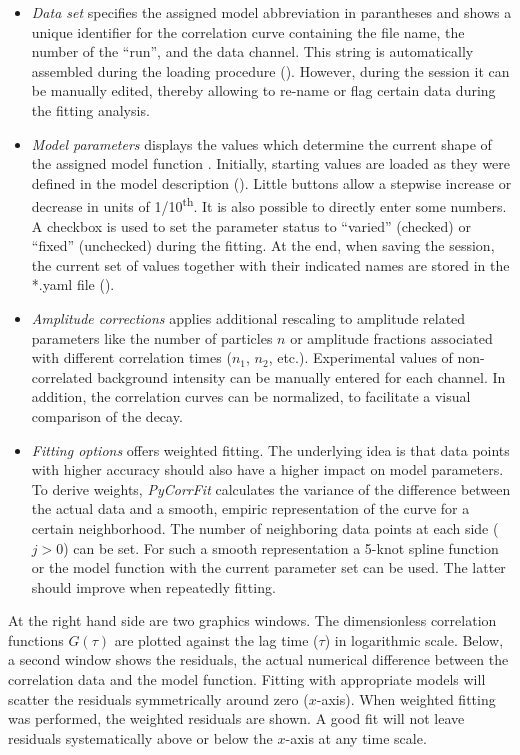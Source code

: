 \begin{itemize}
\item \textit{Data set} specifies the assigned model abbreviation in parantheses and shows a unique identifier for the correlation curve containing the file name, the number of the ``run'', and the data channel. This string is automatically assembled during the loading procedure (). However, during the session it can be manually edited, thereby allowing to re-name or flag certain data during the fitting analysis.
\item \textit{Model parameters} displays the values which determine the current shape of the assigned model function . Initially, starting values are loaded as they were defined in the model description (). Little buttons allow a stepwise increase or decrease in units of 1/10\textsuperscript{th}. It is also possible to directly enter some numbers. A checkbox is used to set the parameter status to ``varied'' (checked) or ``fixed'' (unchecked) during the fitting. At the end, when saving the session, the current set of values together with their indicated names are stored in the *.yaml file (). 
\item \textit{Amplitude corrections} applies additional rescaling to amplitude related parameters like the number of particles $n$ or amplitude fractions associated with different correlation times ($n_1$, $n_2$, etc.). Experimental values of non-correlated background intensity can be manually entered for each channel. In addition, the correlation curves can be normalized, to facilitate a visual comparison of the decay.
\item \textit{Fitting options} offers weighted fitting. The underlying idea is that data points with higher accuracy should also have a higher impact on model parameters. To derive weights, \textit{PyCorrFit} calculates the variance of the difference between the actual data and a smooth, empiric representation of the curve for a certain neighborhood. The number of neighboring data points at each side ($j > 0$) can be set. For such a smooth representation a 5-knot spline function or the model function with the current parameter set can be used. The latter should improve when repeatedly fitting.
\end{itemize}
At the right hand side are two graphics windows. The dimensionless correlation functions $G(\tau)$ are plotted against the lag time ($\tau$) in logarithmic scale. Below, a second window shows the residuals, the actual numerical difference between the correlation data and the model function. Fitting with appropriate models will scatter the residuals symmetrically around zero ($x$-axis). When weighted fitting was performed, the weighted residuals are shown. A good fit will not leave residuals systematically above or below the $x$-axis at any time scale.

